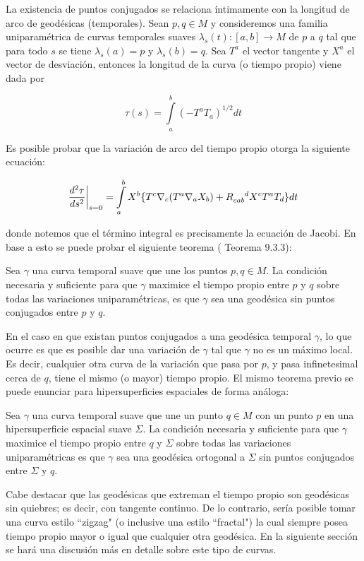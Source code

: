 La existencia de puntos conjugados se relaciona íntimamente con la longitud de arco de geodésicas (temporales). Sean $p,q\in M$ y consideremos una familia uniparamétrica de curvas temporales suaves $\lambda_s(t):[a,b]\rightarrow M$ de $p$ a $q$ tal que para todo $s$ se tiene $\lambda_s(a)=p$ y $\lambda_s(b)=q$. Sea $T^a$ el vector tangente y $X^a$ el vector de desviación, entonces la longitud de la curva (o tiempo propio) viene dada por

$$
\tau(s)=\int\limits_a^b(-T^aT_a)^{1/2}dt
$$

Es posible probar \citep{1984ucp..book.....W} que la variación de arco del tiempo propio otorga la siguiente ecuación: 


$$
\frac{d^2\tau}{ds^2}\bigg\rvert_{s=0}=\int\limits_a^b X^b\{T^c\nabla_c(T^a\nabla_aX_b)+\tensor{R}{_{cab}^d}X^cT^aT_d\}dt
$$

donde notemos que el término integral es precisamente la ecuación de Jacobi. En base a esto se puede probar el siguiente teorema (\citep{1984ucp..book.....W} Teorema 9.3.3):

\begin{theorem}
Sea $\gamma$ una curva temporal suave que une los puntos $p,q\in M$. La condición necesaria y suficiente para que $\gamma$ maximice el tiempo propio entre $p$ y $q$ sobre todas las variaciones uniparamétricas, es que $\gamma$ sea una geodésica sin puntos conjugados entre $p$ y $q$.
\end{theorem}

En el caso en que existan puntos conjugados a una geodésica temporal $\gamma$, lo que ocurre es que es posible dar una variación de $\gamma$ tal que $\gamma$ no es un máximo local. Es decir, cualquier otra curva de la variación que pasa por $p$, y pasa infinetesimal cerca de $q$, tiene el mismo (o mayor) tiempo propio. El mismo teorema previo se puede enunciar para hipersuperficies espaciales de forma análoga:

\begin{theorem}\label{pts conjugados teo temporal}
Sea $\gamma$ una curva temporal suave que une un punto $q\in M$ con un punto $p$ en una hipersuperficie espacial suave $\Sigma$. La condición necesaria y suficiente para que $\gamma$ maximice el tiempo propio entre $q$ y $\Sigma$ sobre todas las variaciones uniparamétricas es que $\gamma$ sea una geodésica ortogonal a $\Sigma$ sin puntos conjugados entre $\Sigma$ y $q$.
\end{theorem}


Cabe destacar que las geodésicas que extreman el tiempo propio son geodésicas sin quiebres; es decir, con tangente continuo. De lo contrario, sería posible tomar una curva estilo ``zigzag" (o inclusive una estilo  ``fractal") la cual siempre posea tiempo propio mayor o igual que cualquier otra geodésica. En la siguiente sección se hará una discusión más en detalle sobre este tipo de curvas.

